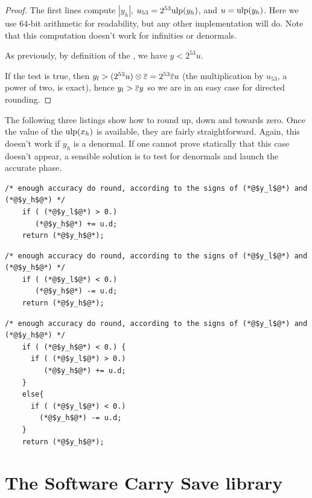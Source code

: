 \begin{proof}
  The first lines compute $|y_h|$, $u_{53}=2^{53}\mbox{ulp}(y_h)$, and
  $u=\mbox{ulp}(y_h)$. Here we use 64-bit arithmetic for readability, but
  any other implementation will do. Note that this computation doesn't
  work for infinities or denormals.
  
  As previously, by definition of the \ulp, we have  $y<2^{53}u$.
  
  If the test is true, then $y_l>(2^{53}u)\otimes{\overline{\varepsilon}} = 
  2^{53}{\overline{\varepsilon}} u $ (the multiplication by $u_{53}$, a power of
  two, is exact), hence $y_l>{\overline{\varepsilon}} y$ so we are in an easy case for directed rounding.

\end{proof}


The following three listings show how to round up, down and towards
zero. Once the value of the $\mbox{ulp}(x_h)$ is available, they are fairly
straightforward. Again, this doesn't work if $y_h$ is a denormal. If
one cannot prove statically that this case doesn't appear, a sensible solution
is to test for denormals and launch the accurate phase.


\begin{lstlisting}[caption={Rounding up}, firstnumber=1]
    /* enough accuracy do round, according to the signs of (*@$y_l$@*) and (*@$y_h$@*) */
    if ( (*@$y_l$@*) > 0.)
       (*@$y_h$@*) += u.d;
    return (*@$y_h$@*);
\end{lstlisting}

\begin{lstlisting}[caption={Rounding down}, firstnumber=1]
    /* enough accuracy do round, according to the signs of (*@$y_l$@*) and (*@$y_h$@*) */
    if ( (*@$y_l$@*) < 0.)
       (*@$y_h$@*) -= u.d;
    return (*@$y_h$@*);
\end{lstlisting}


\begin{lstlisting}[caption={Rounding towards zero}, firstnumber=1]
    /* enough accuracy do round, according to the signs of (*@$y_l$@*) and (*@$y_h$@*) */
    if ( (*@$y_h$@*) < 0.) {
      if ( (*@$y_l$@*) > 0.)
         (*@$y_h$@*) += u.d;
    }
    else{
      if ( (*@$y_l$@*) < 0.)
        (*@$y_h$@*) -= u.d;
    }
    return (*@$y_h$@*);
\end{lstlisting}








\section{The Software Carry Save library}

